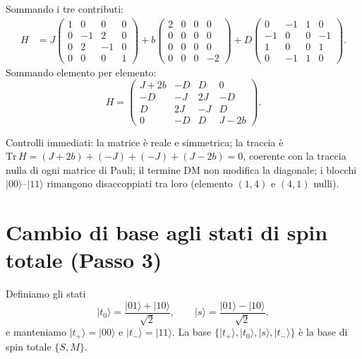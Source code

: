\documentclass[11pt,a4paper]{article}
\newcommand{\ket}[1]{\lvert #1 \rangle}
\theoremstyle{definition}
\begin{document}
Sommando i tre contributi:
\begin{align}
H &= J\!\begin{pmatrix}1&0&0&0\\0&-1&2&0\\0&2&-1&0\\0&0&0&1\end{pmatrix}
+b\!\begin{pmatrix}2&0&0&0\\0&0&0&0\\0&0&0&0\\0&0&0&-2\end{pmatrix}
+D\!\begin{pmatrix}0&-1&1&0\\-1&0&0&-1\\1&0&0&1\\0&-1&1&0\end{pmatrix}.
\end{align}
Sommando elemento per elemento:
\begin{equation}
\boxed{H=\begin{pmatrix}J+2b&-D&D&0\\-D&-J&2J&-D\\D&2J&-J&D\\0&-D&D&J-2b\end{pmatrix}.}
\label{eq:H4x4}
\end{equation}

Controlli immediati: la matrice è reale e simmetrica; la traccia è
$\mathrm{Tr}\,H=(J+2b)+(-J)+(-J)+(J-2b)=0$, coerente con la traccia nulla di ogni matrice di Pauli;
il termine DM non modifica la diagonale; i blocchi $\ket{00}$--$\ket{11}$ rimangono disaccoppiati
tra loro (elemento $(1,4)$ e $(4,1)$ nulli).

\FloatBarrier
\section{Cambio di base agli stati di spin totale (Passo 3)}

Definiamo gli stati
\begin{equation}
\ket{t_0}=\frac{\ket{01}+\ket{10}}{\sqrt2},\qquad
\ket{s}=\frac{\ket{01}-\ket{10}}{\sqrt2},
\label{eq:basis}
\end{equation}
e manteniamo $\ket{t_+}=\ket{00}$ e $\ket{t_-}=\ket{11}$. La base
$\{\ket{t_+},\ket{t_0},\ket{s},\ket{t_-}\}$ è la base di spin totale $\{S,M\}$.
\end{document}
